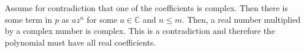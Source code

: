\documentclass[10pt, twocolumn]{article}
\newcommand{\C}{\mathbb{C}}
\begin{document}
\begin{q}[10]
    Assume for contradiction that one of the coefficients is complex. Then there is some term in $ p $ as $ az^n $ for some $ a \in \C $ and $ n \leq m $. Then, a real number multiplied by a complex number is complex. 
    This is a contradiction and therefore the polynomial must have all real coefficients.  
\end{q}
\end{document}
